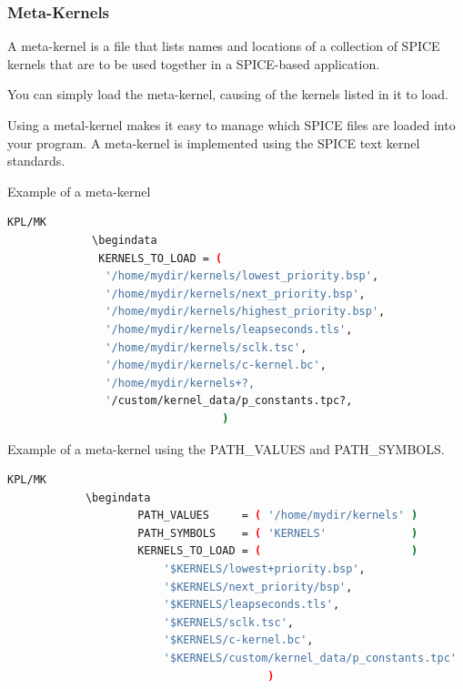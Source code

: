 \documentclass[crop=false,class=book]{standalone}
\begin{document}
            \subsubsection{Meta-Kernels}
            \begin{definition}
            A meta-kernel is a file that lists names and locations of a collection of SPICE kernels that are to be used together in a SPICE-based application.
            \end{definition}
            \begin{remark}
            You can simply load the meta-kernel, causing of the kernels listed in it to load.
            \end{remark}
            Using a metal-kernel makes it easy to manage which SPICE files are loaded into your program. A meta-kernel is implemented using the SPICE text kernel standards.
            \begin{example}
            Example of a meta-kernel
            \begin{lstlisting}[language=bash,basicstyle=\footnotesize]
            KPL/MK
             \begindata
              KERNELS_TO_LOAD = (
               '/home/mydir/kernels/lowest_priority.bsp',
               '/home/mydir/kernels/next_priority.bsp',
               '/home/mydir/kernels/highest_priority.bsp',
               '/home/mydir/kernels/leapseconds.tls',
               '/home/mydir/kernels/sclk.tsc',
               '/home/mydir/kernels/c-kernel.bc',
               '/home/mydir/kernels+?,
               '/custom/kernel_data/p_constants.tpc?,
                                 )
            \end{lstlisting}
            Example of a meta-kernel using the PATH\_VALUES and PATH\_SYMBOLS.
            \begin{lstlisting}[language=bash,basicstyle=\footnotesize]
            KPL/MK
            \begindata  
                    PATH_VALUES     = ( '/home/mydir/kernels' )
                    PATH_SYMBOLS    = ( 'KERNELS'             )
                    KERNELS_TO_LOAD = (                       )
                        '$KERNELS/lowest+priority.bsp',
                        '$KERNELS/next_priority/bsp',
                        '$KERNELS/leapseconds.tls',
                        '$KERNELS/sclk.tsc',
                        '$KERNELS/c-kernel.bc',
                        '$KERNELS/custom/kernel_data/p_constants.tpc'
                                        )
            \end{lstlisting}
            \end{example}
\end{document}
